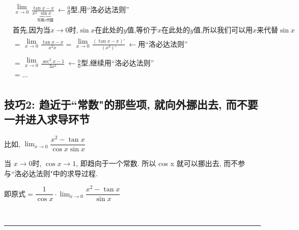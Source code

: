 \documentclass[UTF8]{ctexart}
\begin{document}
\begin{myEnvSample}
\begin{align*}  %
&	\begin{matrix}
	\lim_{x\rightarrow 0}\\
\end{matrix}\frac{\tan x-x}{x^2\underset{\text{可用}x\text{代替}}{\underbrace{\sin x}}}\ \gets \frac{0}{0}\text{型,用}\text{洛必达法则}\\
&\text{首先,因为当}x\rightarrow 0\text{时,}\sin x\text{在此处的}y\text{值,等价于}x\text{在此处的}y\text{值,所以我们可以用}x\text{来代替}\sin x\\
&=\begin{matrix}
	\lim_{x\rightarrow 0}\\
\end{matrix}\frac{\tan x-x}{x^2x}=\begin{matrix}
	\lim_{x\rightarrow 0}\\
\end{matrix}\frac{\left( \tan x-x \right) '}{\left( x^3 \right) '}\ \gets \text{用}\text{洛必达法则}\\
&=\begin{matrix}
	\lim_{x\rightarrow 0}\\
\end{matrix}\frac{\sec ^2x-1}{3x^2}\ \gets \frac{0}{0}\text{型,继续用}\text{洛必达法则}\\
&=...\\
\end{align*}
\end{myEnvSample}




\subsection{技巧2: 趋近于``常数"的那些项, 就向外挪出去, 而不要一并进入求导环节}


\begin{myEnvSample}
比如, $ \lim_{x\rightarrow 0} \dfrac{x^2-\tan x}{\cos x\sin x}$

当 $x \to 0$时,  $\cos x \to 1$, 即趋向于一个常数. 所以 cos x 就可以挪出去, 而不参与``洛必达法则"中的求导过程.

即原式$=\dfrac{1}{\cos x}\cdot \lim_{x\rightarrow 0} \dfrac{x^2-\tan x}{\sin x} $
\end{myEnvSample}





~\\
\hrule
~\\
\end{document}
